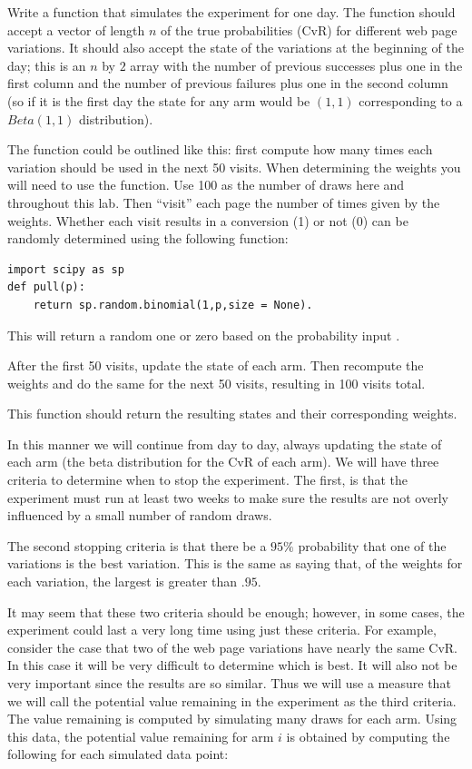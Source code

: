 \begin{problem}
Write a function that simulates the experiment for one day.  The function should accept a vector of length $n$ of the true probabilities (CvR) for different web page variations.  It should also accept the state of the variations at the beginning of the day; this is an $n$ by $2$ array with the number of previous successes plus one in the first column and the number of previous failures plus one in the second column (so if it is the first day the state for any arm would be $(1,1)$ corresponding to a $Beta(1,1)$ distribution).

The function could be outlined like this: first compute how many times each variation should be used in the next 50 visits.  When determining the weights you will need to use the  function.  Use 100 as the number of draws here and throughout this lab.  Then ``visit'' each page the number of times given by the weights.  Whether each visit results in a conversion (1) or not (0) can be randomly determined using the following function:

\begin{lstlisting}[style = python]
import scipy as sp
def pull(p):
    return sp.random.binomial(1,p,size = None).
\end{lstlisting}
This will return a random one or zero based on the probability input .

After the first 50 visits, update the state of each arm.  Then recompute the weights and do the same for the next 50 visits, resulting in 100 visits total.

This function should return the resulting states and their corresponding weights.
\end{problem}

In this manner we will continue from day to day, always updating the state of each arm (the beta distribution for the CvR of each arm).  We will have three criteria to determine when to stop the experiment.  The first, is that the experiment must run at least two weeks to make sure the results are not overly influenced by a small number of random draws.

The second stopping criteria is that there be a $95\%$ probability that one of the variations is the best variation.  This is the same as saying that, of the weights for each variation, the largest is greater than $.95$.

It may seem that these two criteria should be enough; however, in some cases, the experiment could last a very long time using just these criteria.  For example, consider the case that two of the web page variations have nearly the same CvR.  In this case it will be very difficult to determine which is best.  It will also not be very important since the results are so similar.  Thus we will use a measure that we will call the potential value remaining in the experiment as the third criteria.  The value remaining is computed by simulating many draws for each arm.  Using this data, the potential value remaining for arm $i$ is obtained by computing the following for each simulated data point:

